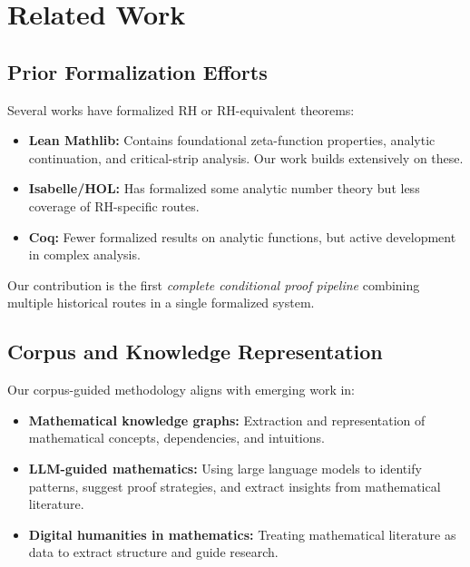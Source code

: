 \documentclass[11pt,a4paper]{article}
\begin{document}
\section{Related Work}
\label{sec:related}

\subsection{Prior Formalization Efforts}

Several works have formalized RH or RH-equivalent theorems:

\begin{itemize}
  \item \textbf{Lean Mathlib:} Contains foundational zeta-function properties, analytic continuation, and critical-strip analysis. Our work builds extensively on these.

  \item \textbf{Isabelle/HOL:} Has formalized some analytic number theory but less coverage of RH-specific routes.

  \item \textbf{Coq:} Fewer formalized results on analytic functions, but active development in complex analysis.
\end{itemize}

Our contribution is the first \emph{complete conditional proof pipeline} combining multiple historical routes in a single formalized system.

\subsection{Corpus and Knowledge Representation}

Our corpus-guided methodology aligns with emerging work in:

\begin{itemize}
  \item \textbf{Mathematical knowledge graphs:} Extraction and representation of mathematical concepts, dependencies, and intuitions.

  \item \textbf{LLM-guided mathematics:} Using large language models to identify patterns, suggest proof strategies, and extract insights from mathematical literature.

  \item \textbf{Digital humanities in mathematics:} Treating mathematical literature as data to extract structure and guide research.
\end{itemize}
\end{document}
